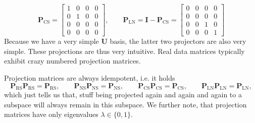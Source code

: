\documentclass[a4paper, 11pt]{scrartcl}
\begin{document}
$$
\bm{P}_\text{CS}
=
\begin{bmatrix}
1 & 0 & 0 & 0\\
0 & 1 & 0 & 0\\
0 & 0 & 0 & 0\\
0 & 0 & 0 & 0
\end{bmatrix},\qquad
\bm{P}_\text{LN} =\bm{I} - \bm{P}_\text{CS} =
\begin{bmatrix}
0 & 0 & 0 & 0\\
0 & 0 & 0 & 0\\
0 & 0 & 1 & 0\\
0 & 0 & 0 & 1
\end{bmatrix}
$$
Because we have a very simple $\bm{U}$ basis, the latter two projectors are also very simple.
These projections are thus very intuitive.
Real data matrices typically exhibit crazy numbered projection matrices.

Projection matrices are always idempotent, i.e. it holds
$$
\bm{P}_\text{RS} \bm{P}_\text{RS} = \bm{P}_\text{RS},\qquad
\bm{P}_\text{NS} \bm{P}_\text{NS} = \bm{P}_\text{NS},\qquad
\bm{P}_\text{CS} \bm{P}_\text{CS} = \bm{P}_\text{CS},\qquad
\bm{P}_\text{LN} \bm{P}_\text{LN} = \bm{P}_\text{LN},
$$
which just tells us that, stuff being projected again and again and again to a subspace will always remain in this subspace. We further note, that projection matrices have only eigenvalues $\lambda \in \{0,1\}$.
\end{document}
